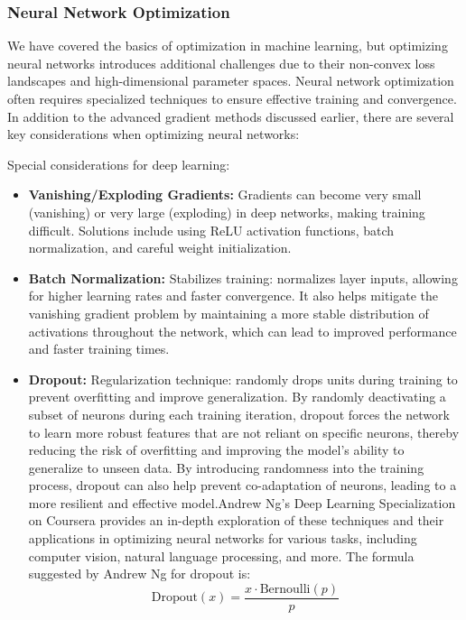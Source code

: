 \documentclass[
  letterpaper,
  DIV=11,
  numbers=noendperiod]{scrreprt}
\begin{document}
\subsubsection{Neural Network
Optimization}\label{neural-network-optimization}

We have covered the basics of optimization in machine learning, but
optimizing neural networks introduces additional challenges due to their
non-convex loss landscapes and high-dimensional parameter spaces. Neural
network optimization often requires specialized techniques to ensure
effective training and convergence. In addition to the advanced gradient
methods discussed earlier, there are several key considerations when
optimizing neural networks:

Special considerations for deep learning:

\begin{itemize}
\item
  \textbf{Vanishing/Exploding Gradients:} Gradients can become very
  small (vanishing) or very large (exploding) in deep networks, making
  training difficult. Solutions include using ReLU activation functions,
  batch normalization, and careful weight initialization.
\item
  \textbf{Batch Normalization:} Stabilizes training: normalizes layer
  inputs, allowing for higher learning rates and faster convergence. It
  also helps mitigate the vanishing gradient problem by maintaining a
  more stable distribution of activations throughout the network, which
  can lead to improved performance and faster training times.
\item
  \textbf{Dropout:} Regularization technique: randomly drops units
  during training to prevent overfitting and improve generalization. By
  randomly deactivating a subset of neurons during each training
  iteration, dropout forces the network to learn more robust features
  that are not reliant on specific neurons, thereby reducing the risk of
  overfitting and improving the model's ability to generalize to unseen
  data. By introducing randomness into the training process, dropout can
  also help prevent co-adaptation of neurons, leading to a more
  resilient and effective model.Andrew Ng's Deep Learning Specialization
  on Coursera provides an in-depth exploration of these techniques and
  their applications in optimizing neural networks for various tasks,
  including computer vision, natural language processing, and more. The
  formula suggested by Andrew Ng for dropout is:
  \[\text{Dropout}(x) = \frac{x \cdot \text{Bernoulli}(p)}{p}\]
\end{itemize}
\end{document}
